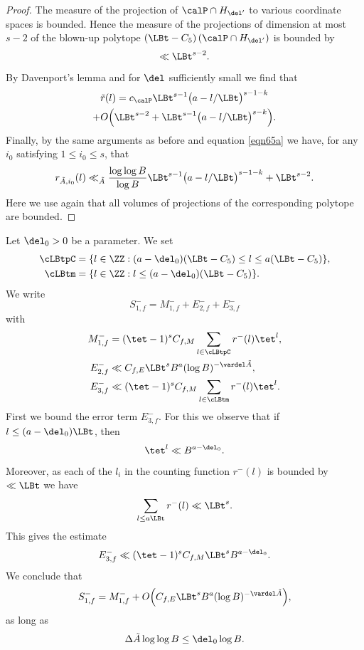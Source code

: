 \begin{proof}
The measure of the projection of $\calP\cap H_{\del'}$ to various coordinate spaces is bounded. Hence the measure of the projections of dimension at most $s-2$ of the blown-up polytope $\left(\LBt -C_5\right)(\calP\cap H_{\del'})$ is bounded by\vspace*{-3pt}
\[
\ll \LBt^{s-2}.
\]
By Davenport's lemma \cite{davenport} and for $\del$ sufficiently small we find that
\begin{multline*}
\tilde{r}(l)=c_{\calP} \LBt^{s-1} \bigl(a- l/{\LBt}\bigr)^{s-1-k} \\
+O\Bigl(\LBt^{s-2}+ \LBt^{s-1} \bigl(a- l/{\LBt}\bigr)^{s-k} \Bigr).
\end{multline*}
Finally, by the same arguments as before and equation \eqref{eqn65a} we have, for any $i_0$ satis\-fying $1\leq i_0\leq s$, that\vspace*{-3pt}
\[
r_{\tilde{A},i_0}(l) \ll_{\tilde{A}} \frac{\log \log B}{\log B}\LBt^{s-1} \bigl(a- l/{\LBt}\bigr)^{s-1-k}+\LBt^{s-2}.
\]
Here we use again that all volumes of projections of the corresponding polytope are bounded.
\end{proof}

Let $\del_0>0$ be a parameter. We set
\begin{align*}
\cLBtpC&=\{l\in\ZZ:(a-\del_0)(\LBt -C_5) \leq l\leq a (\LBt - C_5)\},\\
\cLBtm&=\{l\in\ZZ:l\leq(a-\del_0)(\LBt -C_5)\}.
\end{align*}
We write
\[
S_{1,f}^- = M_{1,f}^-+ E_{2,f}^- + E_{3,f}^-
\]
with
\begin{align*}
M_{1,f}^-&= (\tet -1)^s C_{f,M} \sum_{l\in\cLBtpC} r^-(l) \tet^l,
\\
E_{2,f}^-&\ll C_{f,E} \LBt^s B^{a} (\log B)^{-\vardel \tilde{A}},\\
E_{3,f}^- &\ll (\tet -1)^s C_{f,M} \sum_{l\in\cLBtm} r^-(l) \tet^l.
\end{align*}
First we bound the error term $E_{3,f}^-$. For this we observe that if $l\leq (a-\del_0) \LBt$, then
\[
\tet^l \ll B^{a-\del_0}.
\]
Moreover, as each of the $l_i$ in the counting function $r^-(l)$ is bounded by $\ll \LBt$ we have
\[
\sum_{l\leq a \LBt} r^-(l) \ll \LBt^s.
\]
This gives the estimate
\[
E_{3,f}^-\ll (\tet -1)^s C_{f,M} \LBt^{s} B^{a-\del_0}.
\]
We conclude that
\[
S_{1,f}^-= M_{1,f}^- + O\Bigl(C_{f,E} \LBt^s B^{a} (\log B)^{-\vardel \tilde{A}}\Bigr),
\]
as long as
\begin{equation}\label{eqndelkap}
\Delta \tilde{A} \log \log B \leq \del_0 \log B.
\end{equation}

